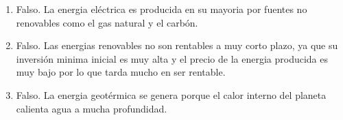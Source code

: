 
\begin{solution}
	
\begin{enumerate}[label=\alph*)]
	\item{}

		\textcolor{samuraiRed}{Falso.} La energia eléctrica es producida en su mayoria 
		por fuentes no renovables como el gas natural y el carbón.
\vspace{1em}
	\item{}

		\textcolor{samuraiRed}{Falso.} Las energias renovables no son rentables a muy corto plazo, ya
		que su inversión minima inicial es muy alta y el precio de la energia producida es muy bajo
		por lo que tarda mucho en ser rentable.

\vspace{1em}

	\item{}

		\textcolor{samuraiRed}{Falso.} La energia geotérmica se genera porque el calor interno del 
		planeta calienta agua a mucha profundidad. 
\vspace{1em}
\end{enumerate}

\end{solution}

